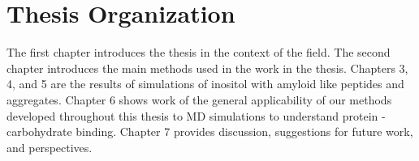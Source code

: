 \section{Thesis Organization}
The first chapter introduces the thesis in the context of the field.  The second chapter introduces the main methods used in the work in the thesis. Chapters 3, 4, and 5 are the results of simulations of inositol with amyloid like peptides and aggregates. Chapter 6 shows work of the general applicability of our methods developed throughout this thesis to MD simulations to understand protein - carbohydrate binding. Chapter 7 provides discussion, suggestions for future work, and perspectives.


